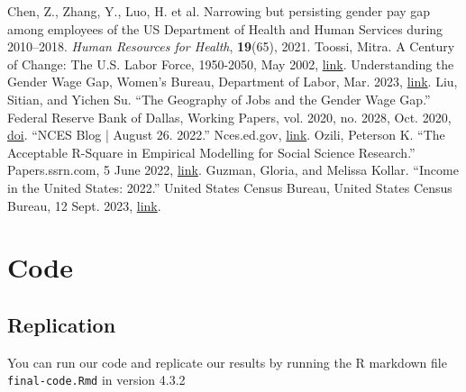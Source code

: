 \documentclass{article}
\begin{document}
\clearpage
\begin{thebibliography}{9}
    Chen, Z., Zhang, Y., Luo, H. et al. Narrowing but persisting gender pay gap among employees of the US Department of Health and Human Services during 2010–2018. \textit{Human Resources for Health}, \textbf{19}(65), 2021.
    Toossi, Mitra. A Century of Change: The U.S. Labor Force, 1950-2050, May 2002, \href{www.bls.gov/opub/mlr/2002/05/art2full.pdf}{link}.
    Understanding the Gender Wage Gap, Women’s Bureau, Department of Labor, Mar. 2023, \href{www.dol.gov/sites/dolgov/files/WB/equalpay/WB_issuebrief-undstg-wage-gap-v1.pdf}{link}. 
    Liu, Sitian, and Yichen Su. “The Geography of Jobs and the Gender Wage Gap.” Federal Reserve Bank of Dallas, Working Papers, vol. 2020, no. 2028, Oct. 2020, \href{https://doi.org/10.24149/wp2028}{doi}. 
    “NCES Blog | August 26. 2022.” Nces.ed.gov, \href{nces.ed.gov/blogs/nces/2022/08/26/default}{link}.
    Ozili, Peterson K. “The Acceptable R-Square in Empirical Modelling for Social Science Research.” Papers.ssrn.com, 5 June 2022, \href{papers.ssrn.com/sol3/papers.cfm?abstract_id=4128165}{link}.
    Guzman, Gloria, and Melissa Kollar. “Income in the United States: 2022.” United States Census Bureau, United States Census Bureau, 12 Sept. 2023, \href{www.census.gov/library/publications/2023/demo/p60-279.html}{link}.
    
\end{thebibliography}

\section*{Code}
\subsection*{Replication}
You can run our code and replicate our results by running the R markdown file \texttt{final-code.Rmd} in version 4.3.2
\end{document}
